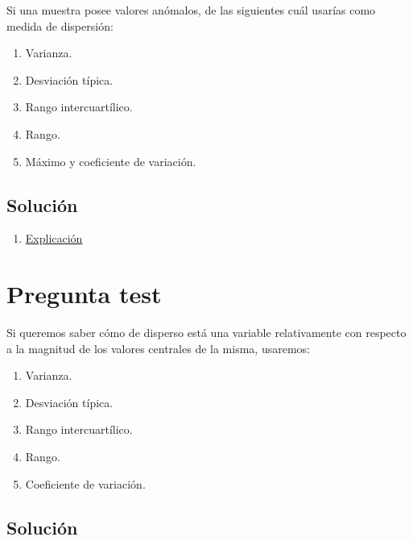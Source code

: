 \documentclass[
]{book}
\providecommand{\tightlist}{%
  \setlength{\itemsep}{0pt}\setlength{\parskip}{0pt}}
\begin{document}
Si una muestra posee valores anómalos, de las siguientes cuál usarías como medida de dispersión:

\begin{enumerate}
\def\labelenumi{\alph{enumi})}
\tightlist
\item
  Varianza.
\item
  Desviación típica.
\item
  Rango intercuartílico.
\item
  Rango.
\item
  Máximo y coeficiente de variación.
\end{enumerate}

\hypertarget{soluciuxf3n-43}{%
\subsection{Solución}\label{soluciuxf3n-43}}

\begin{enumerate}
\def\labelenumi{\alph{enumi})}
\setcounter{enumi}{2}
\tightlist
\item
  \href{https://1fjmanzano.github.io/bioestadistica/medidas-de-posicio\%CC\%81n-dispersio\%CC\%81n-y-forma.html\#medidas-de-dispersio\%CC\%81n}{Explicación}
\end{enumerate}

\hypertarget{pregunta-test-42}{%
\section{Pregunta test}\label{pregunta-test-42}}

Si queremos saber cómo de disperso está una variable relativamente con respecto a la magnitud de los valores centrales de la misma, usaremos:

\begin{enumerate}
\def\labelenumi{\alph{enumi})}
\tightlist
\item
  Varianza.
\item
  Desviación típica.
\item
  Rango intercuartílico.
\item
  Rango.
\item
  Coeficiente de variación.
\end{enumerate}

\hypertarget{soluciuxf3n-44}{%
\subsection{Solución}\label{soluciuxf3n-44}}
\end{document}
